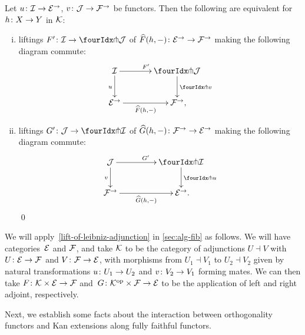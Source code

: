 \documentclass[reqno,10pt,a4paper,oneside,draft]{amsart}
\begin{document}
{{\begin{proposition} \label{lift-of-leibniz-adjunction}
Let $u \co \cal{I} \to \catE^\to$, $v \co \cal{J} \to \cal{F}^\to$ be functors.
Then the following are equivalent for $h \co X \to Y$ in $\cal{K}$:
\begin{enumerate}[(i)]
\item liftings $F' \co \cal{I} \to \liftl{\cal{J}}$ of $\widehat{F}(h, \arghole) \co \catE^\to \to \cal{F}^\to$ making the following diagram commute:
\[
\xymatrix@C=1.2cm{
  \cal{I}
  \ar[r]^{F'}
  \ar[d]_{u}
&
  \liftl{\cal{J}}
  \ar[d]^{\liftl{v}}
\\
  \catE^\to
  \ar[r]_-{\widehat{F}(h, \arghole)}
&
  \cal{F}^\to
\rlap{,}}
\]
\item liftings $G' \co \cal{J} \to \liftr{\cal{I}}$ of $\widehat{G}(h, \arghole) \co \cal{F}^\to \to \catE^\to$ making the following diagram commute:
\[
\xymatrix@C+2em{
  \cal{J}
  \ar[d]_{v}
  \ar[r]^{G'}
&
  \liftr{\cal{I}}
  \ar[d]^{\liftr{u}}
\\
  \cal{F}^\to
  \ar[r]_-{\widehat{G}(h, \arghole)}
&
  \catE^\to
\rlap{.}}
\]
\qed
\end{enumerate}
\end{proposition}


\begin{remark} \label{pitchfork-leibniz-most-general-example}
We will apply~\cref{lift-of-leibniz-adjunction} in \cref{sec:alg-fib} as follows.
We will have categories~$\cal{E}$ and $\cal{F}$, and take $\cal{K}$ to be the category of adjunctions $U \dashv V$ with $U \co \catE \to \cal{F}$ and $V \co \cal{F} \to \catE$, with morphisms from $U_1 \dashv V_1$ to $U_2 \dashv V_2$ given by natural transformations $u \co U_1 \to U_2$ and $v \co V_2 \to V_1$ forming mates.
We can then take $F \co \cal{K} \times \catE \to \cal{F}$ and~$G \co \cal{K}^{\op} \times \cal{F} \to \catE$ to be the application of left and right adjoint, respectively.
\end{remark}

Next, we establish some facts about the interaction between orthogonality functors and Kan extensions along fully faithful functors.

}}
\end{document}
